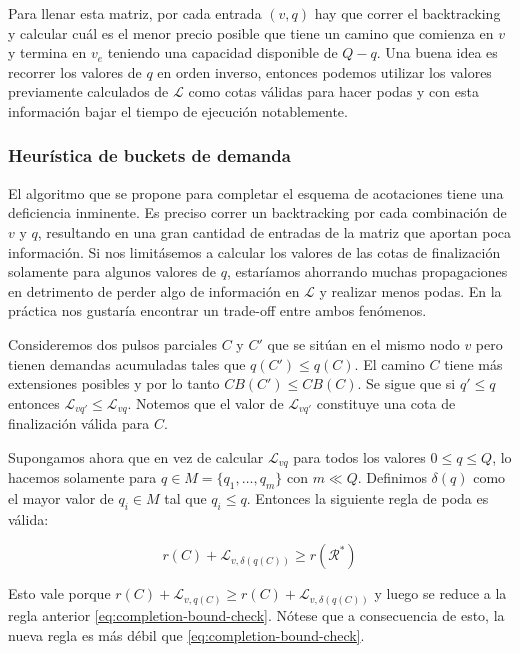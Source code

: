 Para llenar esta matriz, por cada entrada $(v, q)$ hay que correr el backtracking y calcular cuál es el menor precio posible que tiene un camino que comienza en $v$ y termina en $v_e$ teniendo una capacidad disponible de $Q - q$. Una buena idea es recorrer los valores de $q$ en orden inverso, entonces podemos utilizar los valores previamente calculados de $\mathscr{L}$ como cotas válidas para hacer podas y con esta información bajar el tiempo de ejecución notablemente. 

\subsubsection{Heurística de buckets de demanda}

El algoritmo que se propone para completar el esquema de acotaciones tiene una deficiencia inminente. Es preciso correr un backtracking por cada combinación de $v$ y $q$, resultando en una gran cantidad de entradas de la matriz que aportan poca información. Si nos limitásemos a calcular los valores de las cotas de finalización solamente para algunos valores de $q$, estaríamos ahorrando muchas propagaciones en detrimento de perder algo de información en $\mathscr{L}$ y realizar menos podas. En la práctica nos gustaría encontrar un trade-off entre ambos fenómenos.

Consideremos dos pulsos parciales $C$ y $C'$ que se sitúan en el mismo nodo $v$ pero tienen demandas acumuladas tales que $q(C') \leq q(C)$. El camino $C$ tiene más extensiones posibles y por lo tanto $CB(C') \leq CB(C)$. Se sigue que si $q' \leq q$ entonces $\mathscr{L}_{vq'} \leq \mathscr{L}_{vq}$. Notemos que el valor de $\mathscr{L}_{vq'}$ constituye una cota de finalización válida para $C$.

Supongamos ahora que en vez de calcular $\mathscr{L}_{vq}$ para todos los valores $0 \leq q \leq Q$, lo hacemos solamente para $q \in M = \{q_1, \dots, q_m\}$ con $m \ll Q$. Definimos $\delta(q)$ como el mayor valor de $q_i \in M$ tal que $q_i \leq q$. Entonces la siguiente regla de poda es válida:  

\begin{equation}
    r(C) + \mathscr{L}_{v, \delta(q(C))} \geq r(\mathscr{R}^{*})
\end{equation}

Esto vale porque $r(C) + \mathscr{L}_{v, q(C)} \geq r(C) + \mathscr{L}_{v, \delta(q(C))}$ y luego se reduce a la regla anterior \ref{eq:completion-bound-check}. Nótese que a consecuencia de esto, la nueva regla es más débil que \ref{eq:completion-bound-check}.

